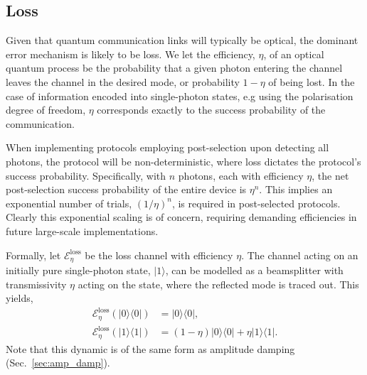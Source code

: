 \documentclass[aps,rmp,twocolumn,amsmath,amssymb,nofootinbib,superscriptaddress,longbibliography,floatfix,table-of-contents,eqsecnum]{revtex4-1}
\newcommand{\bra}[1]{\langle#1|}
\newcommand{\ket}[1]{|#1\rangle}
\begin{document}
%
%

\subsection{Loss} \label{sec:eff_err} 

Given that quantum communication links will typically be optical, the dominant error mechanism is likely to be loss. We let the efficiency, $\eta$, of an optical quantum process be the probability that a given photon entering the channel leaves the channel in the desired mode, or probability \mbox{$1-\eta$} of being lost. In the case of information encoded into single-photon states, e.g using the polarisation degree of freedom, $\eta$ corresponds exactly to the success probability of the communication.

When implementing protocols employing post-selection upon detecting all photons, the protocol will be non-deterministic, where loss dictates the protocol's success probability. Specifically, with $n$ photons, each with efficiency $\eta$, the net post-selection success probability of the entire device is $\eta^n$. This implies an exponential number of trials, \mbox{$(1/\eta)^n$}, is required in post-selected protocols. Clearly this exponential scaling is of concern, requiring demanding efficiencies in future large-scale implementations.

Formally, let $\mathcal{E}^\text{loss}_\eta$ be the loss channel with efficiency $\eta$. The channel acting on an initially pure single-photon state, $\ket{1}$, can be modelled as a beamsplitter with transmissivity $\eta$ acting on the state, where the reflected mode is traced out. This yields,
\begin{align}
\mathcal{E}^\text{loss}_\eta(\ket{0}\bra{0}) &= \ket{0}\bra{0}, \nonumber \\
\mathcal{E}^\text{loss}_\eta(\ket{1}\bra{1}) &= (1-\eta)\ket{0}\bra{0} + \eta\ket{1}\bra{1}.
\end{align}
Note that this dynamic is of the same form as amplitude damping (Sec.~\ref{sec:amp_damp}).
\end{document}
